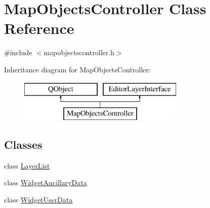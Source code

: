 \hypertarget{class_map_objects_controller}{}\section{Map\+Objects\+Controller Class Reference}
\label{class_map_objects_controller}


{\ttfamily \#include $<$mapobjectscontroller.\+h$>$}

Inheritance diagram for Map\+Objects\+Controller\+:\begin{figure}[H]
\begin{center}
\leavevmode
\includegraphics[height=2.000000cm]{d2/da5/class_map_objects_controller}
\end{center}
\end{figure}
\subsection*{Classes}
\begin{DoxyCompactItemize}
\item 
class \mbox{\hyperlink{class_map_objects_controller_1_1_layer_list}{Layer\+List}}
\item 
class \mbox{\hyperlink{class_map_objects_controller_1_1_widget_ancillary_data}{Widget\+Ancillary\+Data}}
\item 
class \mbox{\hyperlink{class_map_objects_controller_1_1_widget_user_data}{Widget\+User\+Data}}
\end{DoxyCompactItemize}
